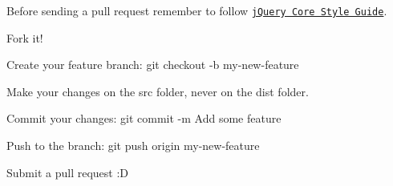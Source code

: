 Before sending a pull request remember to follow \href{http://contribute.jquery.org/style-guide/js/}{\tt j\+Query Core Style Guide}.


\begin{DoxyEnumerate}
\item Fork it!
\item Create your feature branch\+: {\ttfamily git checkout -\/b my-\/new-\/feature}
\item Make your changes on the {\ttfamily src} folder, never on the {\ttfamily dist} folder.
\item Commit your changes\+: {\ttfamily git commit -\/m \textquotesingle{}Add some feature\textquotesingle{}}
\item Push to the branch\+: {\ttfamily git push origin my-\/new-\/feature}
\item Submit a pull request \+:D 
\end{DoxyEnumerate}